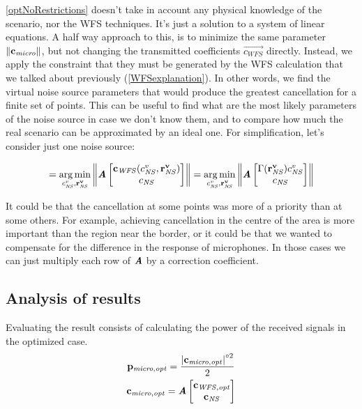 \autoref{optNoRestrictions} doesn't take in account any physical knowledge of the scenario, nor the WFS techniques. It's just a solution to a system of linear equations. A half way approach to this, is to minimize the same parameter $\left\| \mathbf{c_\mathit{micro}} \right\|$, but not changing the transmitted coefficients $\vec{c_{\mathit{WFS}}}$ directly. Instead, we apply the constraint that they must be generated by the WFS calculation that we talked about previously (\autoref{WFSexplanation}). In other words, we find the virtual noise source parameters that would produce the greatest cancellation for a finite set of points. This can be useful to find what are the most likely parameters of the noise source in case we don't know them, and to compare how much the real scenario can be approximated by an ideal one. For simplification, let's consider just one noise source:

\begin{equation}
[\cnsScalar^v, \vec{r_{\mathit{NS}}^v}] =
\argmin_{\cnsScalar^v, \vec{r_{\mathit{NS}}^v}}
\norm{\myMatrix{A}
	\begin{bmatrix}
	\vec{c_\mathit{WFS}}(\cnsScalar^v, \vec{r_{\mathit{NS}}^v})\\
	\cnsScalar\\
	\end{bmatrix}
} =
\argmin_{\cnsScalar^v, \vec{r_{\mathit{NS}}^v}}
\norm{\myMatrix{A}
	\begin{bmatrix}
	\wfsNormCoef[mat](\vec{r_{\mathit{NS}}^v})\cnsScalar^v\\
	\cnsScalar\\
	\end{bmatrix}
}
\end{equation}

It could be that the cancellation at some points was more of a priority than at some others. For example, achieving cancellation in the centre of the area is more important than the region near the border, or it could be that we wanted to compensate for the difference in the response of microphones. In those cases we can just multiply each row of $\bm{\mathit{A}}$ by a correction coefficient.

\subsection{Analysis of results}
Evaluating the result consists of calculating the power of the received signals in the optimized case.
\begin{gather}
	\mathbf{p_\mathit{micro,opt}} = \frac{\left| \mathbf{c_{\mathit{micro,opt}}} \right|^{\circ 2}}{2}
	\\
	\mathbf{c_\mathit{\mathit{micro,opt}}} = \bm{\mathit{A}}
	\begin{bmatrix}
	\mathbf{c_\mathit{WFS,opt}} \\
	\mathbf{c_{\mathit{NS}}}
	\end{bmatrix}
\end{gather}

